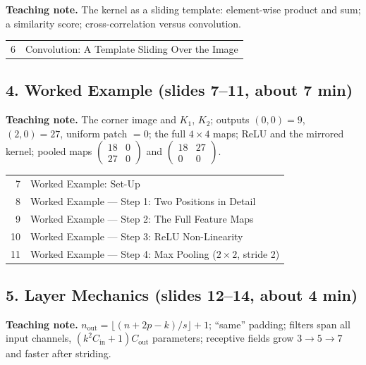\documentclass[11pt]{article}
\begin{document}
\textbf{Teaching note.} The kernel as a sliding template: element-wise product and sum; a similarity score; cross-correlation versus convolution.

\begin{center}\small\renewcommand{\arraystretch}{1.1}\begin{tabularx}{\textwidth}{@{}r X@{}}6 & Convolution: A Template Sliding Over the Image\\\end{tabularx}\end{center}

\subsection{4. Worked Example \normalfont\small\color{GreyN}(slides 7--11, about 7 min)}

\textbf{Teaching note.} The corner image and $K_1$, $K_2$; outputs $(0,0)=9$, $(2,0)=27$, uniform patch $=0$; the full $4\times4$ maps; ReLU and the mirrored kernel; pooled maps $\begin{pmatrix}18&0\\27&0\end{pmatrix}$ and $\begin{pmatrix}18&27\\0&0\end{pmatrix}$.

\begin{center}\small\renewcommand{\arraystretch}{1.1}\begin{tabularx}{\textwidth}{@{}r X@{}}7 & Worked Example: Set-Up\\
8 & Worked Example --- Step 1: Two Positions in Detail\\
9 & Worked Example --- Step 2: The Full Feature Maps\\
10 & Worked Example --- Step 3: ReLU Non-Linearity\\
11 & Worked Example --- Step 4: Max Pooling ($2\times2$, stride 2)\\\end{tabularx}\end{center}

\subsection{5. Layer Mechanics \normalfont\small\color{GreyN}(slides 12--14, about 4 min)}

\textbf{Teaching note.} $n_{\text{out}}=\lfloor(n+2p-k)/s\rfloor+1$; ``same'' padding; filters span all input channels, $(k^2C_{\text{in}}+1)C_{\text{out}}$ parameters; receptive fields grow $3\to5\to7$ and faster after striding.
\end{document}
